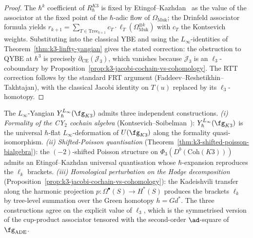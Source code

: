 \begin{proof}
The $\hbar^k$ coefficient of $R_\hbar^{K3}$ is fixed by
Etingof--Kazhdan~\cite{EtingofKazhdan1996} as the value of the
associator at the fixed point of the $\hbar$-adic flow of
$\Omega_{\mathrm{Muk}}$; the Drinfeld associator formula yields
$r_{k+1} = \sum_{T \in \mathrm{Tree}_{k+1}} c_T \cdot
\ell_T(\Omega_{\mathrm{Muk}}^{\otimes k})$ with $c_T$ the Kontsevich
weights. Substituting into the classical YBE and using the
$L_\infty$-identities of Theorem~\ref{thm:k3-linfty-yangian} gives
the stated correction: the obstruction to QYBE at $\hbar^3$ is
precisely $\partial_{\mathrm{CE}}(\mathcal{J}_3)$, which vanishes
because $\mathcal{J}_3$ is an $\ell_3$-coboundary by
Proposition~\ref{prop:k3-jacobi-cochain-vs-cohomology}. The RTT
correction follows by the standard FRT argument
(Faddeev--Reshetikhin--Takhtajan), with the classical Jacobi
identity on $T(u)$ replaced by its $\ell_3$-homotopy.
\end{proof}

\begin{remark}
\label{rem:k3-linfty-three-paths}
The $L_\infty$-Yangian $Y_\hbar^{L_\infty}(\fg_{K3})$ admits three
independent constructions. \emph{(i) Formality of the CY$_2$
cochain algebra} (Kontsevich--Soibelman~\cite{KontsevichSoibelman2009}):
$Y_\hbar^{L_\infty}(\fg_{K3})$ is the universal $\hbar$-flat
$L_\infty$-deformation of $U(\fg_{K3})$ along the formality
quasi-isomorphism. \emph{(ii) Shifted-Poisson quantisation}
(Theorem~\ref{thm:k3-shifted-poisson-bialgebra}): the
$(-2)$-shifted Poisson structure on
$\Phi_3(D^b(\mathrm{Coh}(K3)))$ admits an Etingof--Kazhdan
universal quantisation whose $\hbar$-expansion reproduces the
$\ell_k$ brackets. \emph{(iii) Homological perturbation on the
Hodge decomposition} (Proposition~\ref{prop:k3-jacobi-cochain-vs-cohomology}):
the Kadeishvili
transfer along the harmonic projection $p : \Omega^\bullet(S) \to
H^*(S)$ produces the brackets $\ell_k$ by tree-level summation
over the Green homotopy $h = G d^*$. The three constructions agree on the
explicit value of $\ell_3$, which is the symmetrised version of the
cup-product associator tensored with the second-order $\ad$-square
of $\fg_{\mathrm{ADE}}$.
\end{remark}

